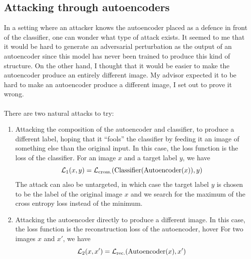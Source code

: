 \documentclass[]{scrarticle}
\begin{document}
\subsection{Attacking through autoencoders}

In a setting where an attacker knows the autoencoder placed as a defence
in front of the classifier, one can wonder what type of attack exists.
It seemed to me that it would be hard to generate an adversarial perturbation
as the output of an autoencoder since this model has never been trained
to produce this kind of structure. On the other hand, I thought that it would
be easier to make the autoencoder produce an entirely different image.
My advisor expected it to be hard to make an autoencoder produce a different
image, I set out to prove it wrong.

\paragraph{}
There are two natural attacks to try:
\begin{enumerate}
  \item Attacking the composition of the autoencoder and classifier, to
    produce a different label, hoping that it ``fools'' the classifier
    by feeding it an image of something else than the original input.
    In this case, the loss function is the loss of the classifier.
    For an image $x$ and a target label $y$, we have
    \[
      \mathcal L_1(x, y) = \mathcal L_{\text{cross.}}(\mathrm{Classifier}(\mathrm{Autoencoder}(x)), y)
    \]
    The attack can also be untargeted, in which case the target label $y$
    is chosen to be the label of the original image $x$ and we search
    for the maximum of the cross entropy loss instead of the minimum.
  \item Attacking the autoencoder directly to produce a different image.
    In this case, the loss function is the reconstruction loss of the autoencoder,
    hover
    For two images $x$ and $x'$, we have
    \[
      \mathcal L_2(x, x') = \mathcal L_{\text{rec.}}(\mathrm{Autoencoder}(x), x')
    \]
\end{enumerate}
\end{document}
